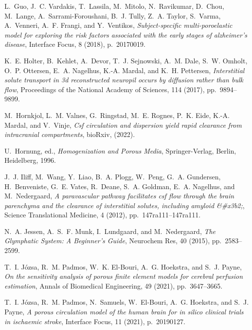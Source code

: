 \documentclass[10pt,letterpaper]{article}
\newcommand{\1}{^{(1)}}
\newcommand{\2}{^{(2)}}
\begin{document}
\begin{thebibliography}{10}
{\sc L.~Guo, J.~C. Vardakis, T.~Lassila, M.~Mitolo, N.~Ravikumar, D.~Chou,
  M.~Lange, A.~Sarrami-Foroushani, B.~J. Tully, Z.~A. Taylor, S.~Varma,
  A.~Venneri, A.~F. Frangi, and Y.~Ventikos}, {\em Subject-specific
  multi-poroelastic model for exploring the risk factors associated with the
  early stages of alzheimer's disease}, Interface Focus, 8 (2018), p.~20170019.

{\sc K.~E. Holter, B.~Kehlet, A.~Devor, T.~J. Sejnowski, A.~M. Dale, S.~W.
  Omholt, O.~P. Ottersen, E.~A. Nagelhus, K.-A. Mardal, and K.~H. Pettersen},
  {\em Interstitial solute transport in 3d reconstructed neuropil occurs by
  diffusion rather than bulk flow}, Proceedings of the National Academy of
  Sciences, 114 (2017), pp.~9894--9899.

{\sc M.~Hornkjol, L.~M. Valnes, G.~Ringstad, M.~E. Rognes, P.~K. Eide, K.-A.
  Mardal, and V.~Vinje}, {\em Csf circulation and dispersion yield rapid
  clearance from intracranial compartments}, bioRxiv,  (2022).

{\sc U.~Hornung}, ed., {\em Homogenization and Porous Media}, Springer-Verlag,
  Berlin, Heidelberg, 1996.

{\sc J.~J. Iliff, M.~Wang, Y.~Liao, B.~A. Plogg, W.~Peng, G.~A. Gundersen,
  H.~Benveniste, G.~E. Vates, R.~Deane, S.~A. Goldman, E.~A. Nagelhus, and
  M.~Nedergaard}, {\em A paravascular pathway facilitates csf flow through the
  brain parenchyma and the clearance of interstitial solutes, including amyloid
  \&\#x3b2;}, Science Translational Medicine, 4 (2012), pp.~147ra111--147ra111.

{\sc N.~A. Jessen, A.~S.~F. Munk, I.~Lundgaard, and M.~Nedergaard}, {\em The
  {Glymphatic} {System}: {A} {Beginner}’s {Guide}}, Neurochem Res, 40 (2015),
  pp.~2583--2599.

{\sc T.~I. J{\'o}zsa, R.~M. Padmos, W.~K. El-Bouri, A.~G. Hoekstra, and S.~J.
  Payne}, {\em On the sensitivity analysis of porous finite element models for
  cerebral perfusion estimation}, Annals of Biomedical Engineering, 49 (2021),
  pp.~3647--3665.

{\sc T.~I. J{\'o}zsa, R.~M. Padmos, N.~Samuels, W.~El-Bouri, A.~G. Hoekstra,
  and S.~J. Payne}, {\em A porous circulation model of the human brain for in
  silico clinical trials in ischaemic stroke}, Interface Focus, 11 (2021),
  p.~20190127.


\end{thebibliography}
\end{document}

